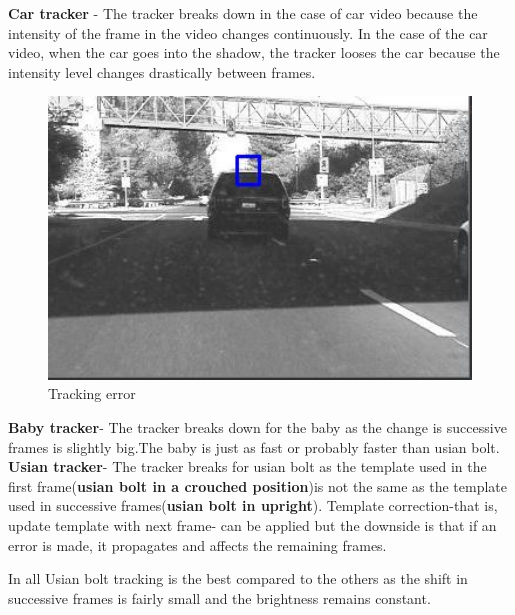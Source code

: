 \documentclass[12pt]{article}
\begin{document}
\textbf{Car tracker} -
The tracker breaks down in the case of car video because the intensity of the frame in the video changes continuously. In the case of the car video, when the car goes into the shadow, the tracker looses the car because the intensity level changes drastically between frames. 
\begin{figure}[h]
    \centering
    \includegraphics[width=12cm]{trackcar3}
    \caption{Tracking error}
    \label{fig:Tracking error}
\end{figure}

\textbf{Baby tracker}-
The tracker breaks down for the baby as the change is successive frames is slightly big.The baby is just as fast or probably 
faster than usian bolt. \\

\textbf{Usian tracker}-
The tracker breaks for usian bolt as the template used in the first frame(\textbf{usian bolt in a crouched position})is not the same as the template used in successive frames(\textbf{usian bolt in upright}). Template correction-that is, update template with next frame- can be applied but the downside is that if an error is made, it propagates and affects the remaining frames.

In all Usian bolt tracking is the best compared to the others as the shift in successive frames is fairly small and the brightness remains constant.
\end{document}
